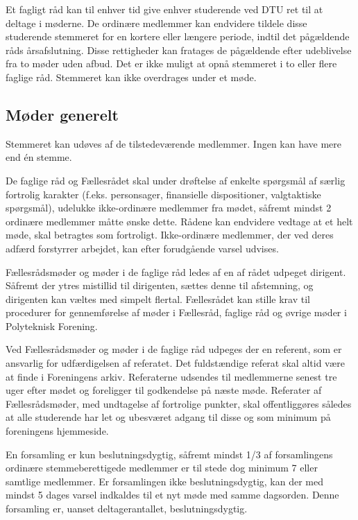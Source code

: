 \begin{list}
\item  Et fagligt råd kan til enhver tid give enhver studerende ved DTU ret til at deltage i møderne. De ordinære medlemmer kan endvidere tildele disse studerende stemmeret for en kortere eller længere periode, indtil det pågældende råds årsafslutning. Disse rettigheder kan fratages de pågældende efter udeblivelse fra to møder uden afbud. Det er ikke muligt at opnå stemmeret i to eller flere faglige råd. Stemmeret kan ikke overdrages under et møde.


\subsection{Møder generelt}
\label{S:kap:MoederGenerelt}
\item  \label{S:MoederGenerelt:stemmeret} Stemmeret kan udøves af de tilstedeværende medlemmer. Ingen kan have mere end én stemme.

\item \label{S:MoederGenerelt:fortrolig} De faglige råd og Fællesrådet skal under drøftelse af enkelte spørgsmål af særlig fortrolig karakter (f.eks. personsager, finansielle dispositioner, valgtaktiske spørgsmål), udelukke ikke-ordinære medlemmer fra mødet, såfremt mindst 2 ordinære medlemmer måtte ønske dette. Rådene kan endvidere vedtage at et helt møde, skal betragtes som fortroligt. Ikke-ordinære medlemmer, der ved deres adfærd forstyrrer arbejdet, kan efter forudgående varsel udvises.

\item  Fællesrådsmøder og møder i de faglige råd ledes af en af rådet udpeget dirigent. Såfremt der ytres mistillid til dirigenten, sættes denne til afstemning, og dirigenten kan væltes med simpelt flertal. Fællesrådet kan stille krav til procedurer for gennemførelse af møder i Fællesråd, faglige råd og øvrige møder i Polyteknisk Forening.

\item  Ved Fællesrådsmøder og møder i de faglige råd udpeges der en referent, som er ansvarlig for udfærdigelsen af referatet. Det fuldstændige referat skal altid være at finde i Foreningens arkiv. Referaterne udsendes til medlemmerne senest tre uger efter mødet og foreligger til godkendelse på næste møde. Referater af Fællesrådsmøder, med undtagelse af fortrolige punkter, skal offentliggøres således at alle studerende har let og ubesværet adgang til disse og som minimum på foreningens hjemmeside.

\item  En forsamling er kun beslutningsdygtig, såfremt mindst 1/3 af forsamlingens ordinære stemmeberettigede medlemmer er til stede dog minimum 7 eller samtlige medlemmer. Er forsamlingen ikke beslutningsdygtig, kan der med mindst 5 dages varsel indkaldes til et nyt møde med samme dagsorden. Denne forsamling er, uanset deltagerantallet, beslutningsdygtig.


\end{list}
